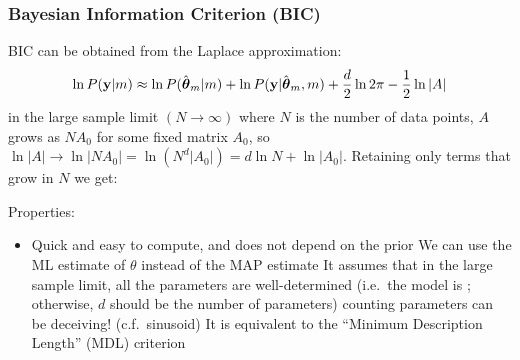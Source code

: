 \begin{frame}
\frametitle{Bayesian Information Criterion (BIC) }

BIC can be obtained from the Laplace approximation:
\begin{equation}
\ln P(\mathbf{y}|m) \approx \ln P(\hat{\boldsymbol{\theta}}_m|m) + \ln
P(\mathbf{y}|\hat{\boldsymbol{\theta}}_m,m) + \frac{d}{2} \ln 2 \pi - \frac{1}{2} \ln
|A| \nonumber
\end{equation}
in the large sample limit $(N\rightarrow \infty)$ where $N$ is the
number of data points, $A$ grows as $N A_0$ for some fixed matrix
$A_0$, so $\ln |A| \rightarrow \ln |NA_0| = \ln (N^d |A_0|) = d \ln N +
\ln |A_0|$. Retaining only terms that grow in $N$ we get:

\vspace*{-5ex}
Properties:
\begin{itemize}
\item Quick and easy to compute, and does not depend on the prior
\im We can use the ML estimate of $\theta$ instead of the MAP estimate
\im It assumes that in the large sample limit, all the parameters are
well-determined (i.e.\ the model is ; otherwise, $d$
should be the number of  parameters)
\im {} counting parameters can be deceiving! (c.f.\ sinusoid)
\im It is equivalent to the ``Minimum Description Length'' (MDL) criterion 
\end{itemize}

\end{frame}
